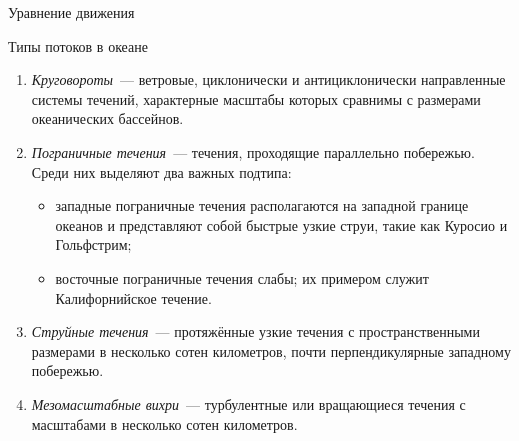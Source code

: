 \begin{chapter}{Уравнение движения}
\begin{section}{Типы потоков в океане}
\begin{enumerate}
\item
\emph{Круговороты}~--- ветровые, циклонически и антициклонически
направленные системы течений, характерные масштабы которых сравнимы с
размерами океанических бассейнов.
%

\item
\emph{Пограничные течения}~--- течения, проходящие параллельно
побережью. Среди них выделяют два важных подтипа: 
%
%
\begin{itemize}
 \item западные пограничные течения располагаются на западной
 границе океанов и представляют собой быстрые узкие струи, такие как
 Куросио и Гольфстрим;
%

 \item восточные пограничные течения слабы; их примером служит Калифорнийское
 течение.
%
\end{itemize}

\item
\emph{Струйные течения}~--- протяжённые узкие течения с
пространственными размерами в несколько сотен километров, почти
перпендикулярные западному побережью.
%

\item
\emph{Мезомасштабные вихри}~--- турбулентные или вращающиеся течения
с масштабами в несколько сотен километров.
%
\end{enumerate}


\end{section}
\end{chapter}
